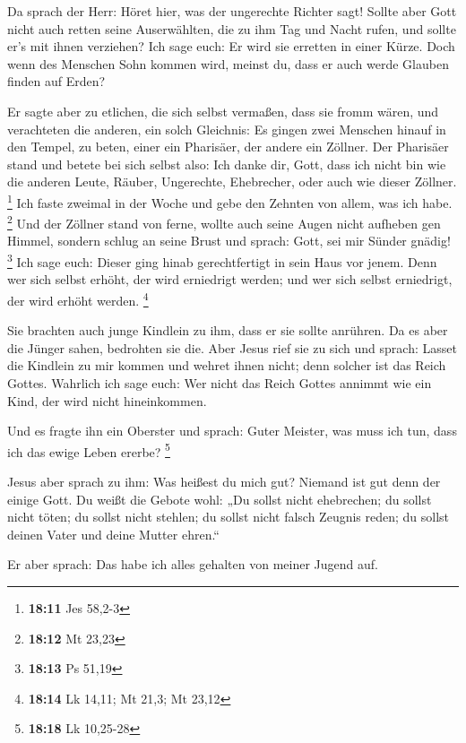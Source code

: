  Da sprach der Herr: Höret hier, was der ungerechte Richter
sagt!  Sollte aber Gott nicht auch retten seine
Auserwählten, die zu ihm Tag und Nacht rufen, und sollte er's mit ihnen
verziehen?  Ich sage euch: Er wird sie erretten in einer
Kürze. Doch wenn des Menschen Sohn kommen wird, meinst du, dass er auch
werde Glauben finden auf Erden?

 Er sagte aber zu etlichen, die sich selbst vermaßen, dass
sie fromm wären, und verachteten die anderen, ein solch Gleichnis:
 Es gingen zwei Menschen hinauf in den Tempel, zu beten,
einer ein Pharisäer, der andere ein Zöllner.  Der Pharisäer
stand und betete bei sich selbst also: Ich danke dir, Gott, dass ich
nicht bin wie die anderen Leute, Räuber, Ungerechte, Ehebrecher, oder
auch wie dieser Zöllner. \footnote{\textbf{18:11} Jes 58,2-3}
 Ich faste zweimal in der Woche und gebe den Zehnten von
allem, was ich habe. \footnote{\textbf{18:12} Mt 23,23} 
Und der Zöllner stand von ferne, wollte auch seine Augen nicht aufheben
gen Himmel, sondern schlug an seine Brust und sprach: Gott, sei mir
Sünder gnädig! \footnote{\textbf{18:13} Ps 51,19}  Ich sage
euch: Dieser ging hinab gerechtfertigt in sein Haus vor jenem. Denn wer
sich selbst erhöht, der wird erniedrigt werden; und wer sich selbst
erniedrigt, der wird erhöht werden. \footnote{\textbf{18:14} Lk 14,11;
  Mt 21,3; Mt 23,12}

 Sie brachten auch junge Kindlein zu ihm, dass er sie
sollte anrühren. Da es aber die Jünger sahen, bedrohten sie die.
 Aber Jesus rief sie zu sich und sprach: Lasset die
Kindlein zu mir kommen und wehret ihnen nicht; denn solcher ist das
Reich Gottes.  Wahrlich ich sage euch: Wer nicht das Reich
Gottes annimmt wie ein Kind, der wird nicht hineinkommen.

 Und es fragte ihn ein Oberster und sprach: Guter Meister,
was muss ich tun, dass ich das ewige Leben ererbe? \footnote{\textbf{18:18}
  Lk 10,25-28}

 Jesus aber sprach zu ihm: Was heißest du mich gut? Niemand
ist gut denn der einige Gott.  Du weißt die Gebote wohl:
„Du sollst nicht ehebrechen; du sollst nicht töten; du sollst nicht
stehlen; du sollst nicht falsch Zeugnis reden; du sollst deinen Vater
und deine Mutter ehren.``

 Er aber sprach: Das habe ich alles gehalten von meiner
Jugend auf.

